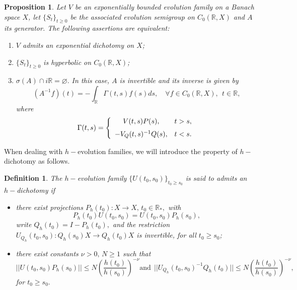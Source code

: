 \documentclass[10pt]{amsart}
\newtheorem{definition}{Definition}
\newtheorem{proposition}{Proposition}
\numberwithin{equation}{section}
\begin{document}
 \begin{proposition}\label{DicotV}
   Let $V$ be an exponentially bounded evolution family on a Banach space $X$, let $\{S_t\}_{t \ge 0 }$ be the associated evolution semigroup on  $C_0(\mathbb{R},X)$ and $A$ its generator. The following assertions are equivalent:

\begin{enumerate}
    \item $V$ admits an exponential dichotomy on $X$;

\item $\{ S_t\}_{t \ge 0 }$ is hyperbolic on $C_0(\mathbb{R},X)$;

\item  $\sigma(A) \cap i\mathbb{R} = \varnothing.$ In this case, $A$ is invertible and its inverse is given by 
$$
(A^{-1}f)(t) = - \int_{\mathbb{R}} \Gamma(t,s) f(s) ds, \quad \forall f \in C_0(\mathbb{R},X), \ \ t \in \mathbb{R},
$$
where 
$$
\Gamma(t,s) = \left\{ 
\begin{array}{cl}
\medskip
   V(t,s)P(s),  &  t > s, \\
    - V_Q(t,s)^{-1} Q(s) , & t < s.
\end{array}
\right.
$$

\end{enumerate}
   
   \end{proposition}



\medskip
 When dealing with $h-$evolution families, we will introduce the property of $h-$dichotomy as follows.

\begin{definition}\label{h-dich}
The $h-$evolution family  $\{U(t_0,s_0)\}_{t_0 \ge s_0 }$ is said to admits an  $h-$dichotomy if 
\begin{itemize}
    

\item[(a)] there exist projections $P_h(t_0): X \to X, \, t_0 \in \mathbb{R}_*,$ with 
$$P_h(t_0) U(t_0,s_0) = U(t_0,s_0) P_h(s_0),$$ 
write $Q_h(t_0) = I - P_h(t_0),$ and the restriction $U_{Q_h}(t_0,s_0): Q_h(s_0)X \to Q_h(t_0)X$ is invertible, for all $t_0 \ge s_0$;

\item[(b)] there exist constants $\nu > 0, \,  N\ge 1$ such that 
$$
||U(t_0,s_0)P_h(s_0)|| \le N \left(\frac{h(t_0)}{h(s_0)}\right)^{-\nu} \mbox{and} \ \ ||U_{Q_h}(t_0,s_0)^{-1}Q_h(t_0)|| \le N \left(\frac{h(t_0)}{h(s_0)}\right)^{-\nu},
$$
for $t_0 \ge s_0.$
\end{itemize}
\medskip

\end{definition}
\end{document}
